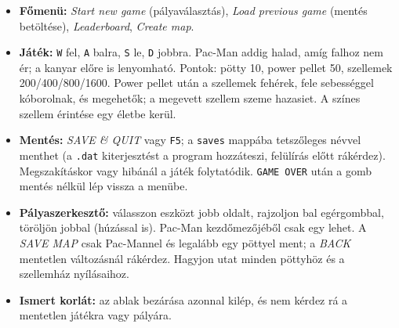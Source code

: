 \documentclass[11pt, a4paper]{article}
\begin{document}
\begin{itemize}[itemsep=2pt]
    \item \textbf{Főmenü:} \textit{Start new game} (pályaválasztás), \textit{Load previous game} (mentés betöltése), \textit{Leaderboard}, \textit{Create map}.
    \item \textbf{Játék:} \texttt{W} fel, \texttt{A} balra, \texttt{S} le, \texttt{D} jobbra. Pac-Man addig halad, amíg falhoz nem ér; a kanyar előre is lenyomható. Pontok: pötty 10, power pellet 50, szellemek 200/400/800/1600. Power pellet után a szellemek fehérek, fele sebességgel kóborolnak, és megehetők; a megevett szellem szeme hazasiet. A színes szellem érintése egy életbe kerül.
    \item \textbf{Mentés:} \textit{SAVE \& QUIT} vagy \texttt{F5}; a \texttt{saves} mappába tetszőleges névvel menthet (a \texttt{.dat} kiterjesztést a program hozzáteszi, felülírás előtt rákérdez). Megszakításkor vagy hibánál a játék folytatódik. \texttt{GAME OVER} után a gomb mentés nélkül lép vissza a menübe.
    \item \textbf{Pályaszerkesztő:} válasszon eszközt jobb oldalt, rajzoljon bal egérgombbal, töröljön jobbal (húzással is). Pac-Man kezdőmezőjéből csak egy lehet. A \textit{SAVE MAP} csak Pac-Mannel és legalább egy pöttyel ment; a \textit{BACK} mentetlen változásnál rákérdez. Hagyjon utat minden pöttyhöz és a szellemház nyílásaihoz.
    \item \textbf{Ismert korlát:} az ablak bezárása azonnal kilép, és nem kérdez rá a mentetlen játékra vagy pályára.
\end{itemize}
\end{document}
